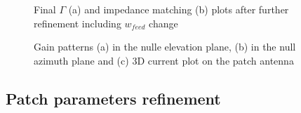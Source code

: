 \documentclass[10 pt,a4paper,twocolumn]{article}
\begin{document}
{\begin{figure}[bt!]
		\begin{subfigure}{0.45\linewidth}
				\def\svgwidth{\linewidth}
			\tiny{}
					\caption{}
		\end{subfigure}
	\hfill
		\begin{subfigure}{0.48\linewidth}
				\def\svgwidth{\linewidth}
			\tiny{}
					\caption{}
		\end{subfigure}
		\caption{Final $\Gamma$ (a) and impedance matching (b) plots after further refinement including $w_{feed}$ change}
		\label{fig:Gamma and Z}
\end{figure}

\begin{figure}[bt!]
		\begin{subfigure}[b]{0.28\linewidth}
				\def\svgwidth{\linewidth}
			\tiny{}
			\caption{}	\end{subfigure}
		\hfill
		\begin{subfigure}[b]{0.28\linewidth}
					\def\svgwidth{\linewidth}
			\tiny{}
			\caption{}	\end{subfigure}
		\hfill
		\begin{subfigure}[b]{0.34\linewidth}
					\def\svgwidth{\linewidth}
			\tiny{}
			\caption{} \end{subfigure}
		\hfill
		\caption{Gain patterns (a) in the nulle elevation plane, (b) in the null azimuth plane and (c) 3D current plot on the patch antenna }
\end{figure}



\subsection*{Patch parameters refinement}
\begin{figure}[bt!]
	
	\begin{subfigure}[t]{0.32\linewidth}
		\def\svgwidth{\linewidth}
		\tiny{}
		\caption{}
		\label{eq:minG vs mesh}
	\end{subfigure}
	\hfill
	\begin{subfigure}[t]{0.32\linewidth}
		\def\svgwidth{\linewidth}
		\tiny{}
		

\end{subfigure}
\end{figure}}
\end{document}
